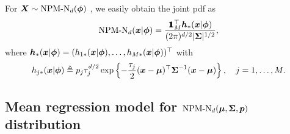 For $\ibX \sim \mbox{NPM-N}_d(\bphi)$ , we easily obtain the joint pdf as
\begin{eqnarray}    \label{zyf.four.3.2}
    \mbox{NPM-N}_d(\ibx | \bphi) = \frac{\1_M^\top \ibh_*(\ibx | \bphi)}{(2\pi)^{d/2} |\bSi|^{1/2}},
\end{eqnarray}
where $\ibh_*(\ibx | \bphi) = (h_{1*}(\ibx | \bphi), \dots, h_{M*}(\ibx | \bphi))^\top$ with
\begin{eqnarray*}
    h_{j*}(\ibx | \bphi) \teq p_j \tau_j^{d / 2} \exp\left\{-\frac{\tau_j}{2} (\ibx - \bmu)^\top \bSi^{-1} (\ibx - \bmu)\right\}, \quad j = 1, \dots, M.
\end{eqnarray*}

\subsection{Mean regression model for $\NPMN$ distribution}\label{zyf.four.sec:NPMN.reg}        %

